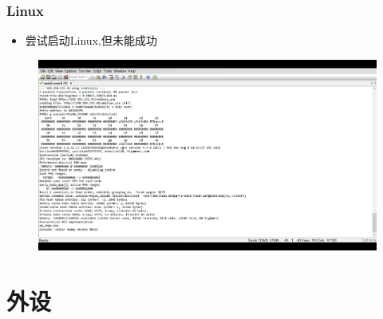 \documentclass{beamer}
\begin{document}
\begin{frame}
    \frametitle{Linux}

    \begin{minipage}[c]{0.4\linewidth}
        \begin{itemize}
        \item 尝试启动Linux,但未能成功
        \end{itemize}
    \end{minipage}
    \hfill
    \begin{minipage}{0.5\linewidth}
        \begin{figure}
            \centering
            \includegraphics[width=1.1\textwidth]{pic/Linux.pdf}
        \end{figure}
    \end{minipage}

\end{frame}

\section{外设}
\end{document}

